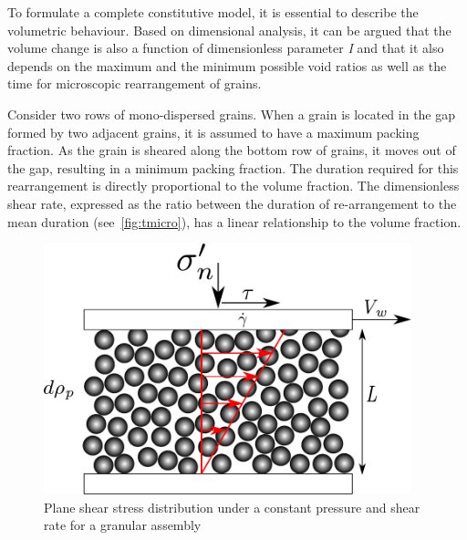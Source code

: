 To formulate a complete constitutive model, it is essential to describe the 
volumetric behaviour. Based on dimensional analysis, it can be argued that the 
volume change is also a function of dimensionless parameter \textit{I} and that 
it also depends on the maximum and the minimum possible void ratios as well as 
the time for microscopic rearrangement of grains.

Consider two rows of mono-dispersed grains. When a grain is located in the gap 
formed by two adjacent grains, it is assumed to have a maximum packing 
fraction. As the grain is sheared along the bottom row of grains, it moves out 
of the gap, resulting in a minimum packing fraction. The duration required for 
this rearrangement is directly proportional to the volume fraction. The 
dimensionless shear rate, expressed as the ratio between the duration of 
re-arrangement to the mean duration (see~\cref{fig:tmicro}), has a linear 
relationship to the volume fraction.

\begin{figure}[tbhp]
\centering
\includegraphics[width=0.95\textwidth]{Rheology}
\caption{Plane shear stress distribution under a constant pressure and shear 
rate for a granular assembly}
\label{fig:rheology}
\end{figure}

